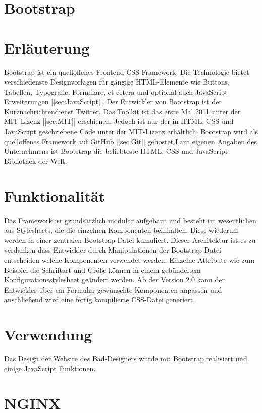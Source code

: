\newpage
\clearpage

\section{Bootstrap}
\cite{BootStrap_Website} \cite{BootStrap_About}
\section*{Erläuterung}
Bootstrap ist ein quelloffenes Frontend-CSS-Framework. Die Technologie bietet verschiedenste Designvorlagen für gängige HTML-Elemente wie Buttons, Tabellen, Typografie, Formulare, et cetera  und optional auch JavaScript-Erweiterungen [\ref{sec:JavaScript}]. Der Entwickler von Bootstrap ist der Kurznachrichtendienst Twitter. Das Toolkit ist das erste Mal 2011 unter der MIT-Lizenz [\ref{sec:MIT}] erschienen. Jedoch ist nur der in HTML, CSS und JavaScript geschriebene Code unter der MIT-Lizenz erhältlich. Bootstrap wird als quelloffenes Framework auf GitHub [\ref{sec:Git}] gehostet.Laut eigenen Angaben des Unternehmens ist Bootstrap die beliebteste HTML, CSS und JavaScript Bibliothek der Welt.

\section*{Funktionalität}
Das Framework ist grundsätzlich modular aufgebaut und besteht im wesentlichen aus Stylesheets, die die einzelnen Komponenten beinhalten. Diese wiederum werden in einer zentralen Bootstrap-Datei kumuliert. Dieser Architektur ist es zu verdanken dass Entwickler durch Manipulationen der Bootstrap-Datei entscheiden welche Komponenten verwendet werden. Einzelne Attribute wie zum Beispiel die Schriftart und Größe können in einem gebündeltem Konfigurationsstylesheet geändert werden. Ab der Version 2.0 kann der Entwickler über ein Formular gewünschte Komponenten anpassen und anschließend wird eine fertig kompilierte CSS-Datei generiert. 
\section*{Verwendung}
Das Design der Website des Bad-Designers wurde mit Bootstrap realisiert und einige JavaScript Funktionen.

\newpage
\clearpage 


\section{NGINX}\label{sec:NGINX}
